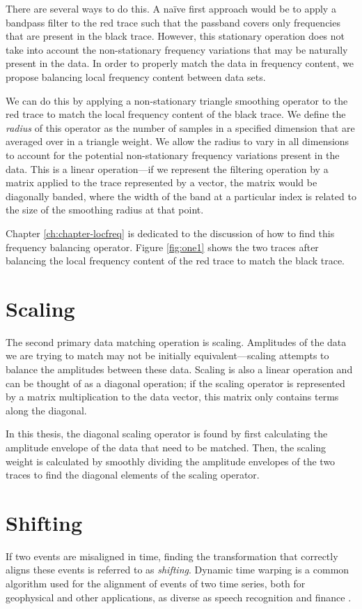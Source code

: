 There are several ways to do this.
A na\"ive first approach would be to apply a bandpass filter to the red trace such that the passband covers only frequencies that are present in the black trace.
However, this stationary operation does not take into account the non-stationary frequency variations that may be naturally present in the data.
In order to properly match the data in frequency content, we propose balancing local frequency content between data sets.

We can do this by applying a non-stationary triangle smoothing operator to the red trace to match the local frequency content of the black trace.
We define the {\em radius} of this operator as the number of samples in a specified dimension that are averaged over in a triangle weight.
We allow the radius to vary in all dimensions to account for the potential non-stationary frequency variations present in the data.
This is a linear operation---if we represent the filtering operation by a matrix applied to the trace represented by a vector, the matrix would be diagonally banded, where the width of the band at a particular index is related to the size of the smoothing radius at that point.

Chapter \ref{ch:chapter-locfreq} is dedicated to the discussion of how to find this frequency balancing operator.
Figure \ref{fig:one1} shows the two traces after balancing the local frequency content of the red trace to match the black trace.


\section{Scaling}
The second primary data matching operation is scaling. 
Amplitudes of the data we are trying to match may not be initially equivalent---scaling attempts to balance the amplitudes between these data.
Scaling is also a linear operation and can be thought of as a diagonal operation; if the scaling operator is represented by a matrix multiplication to the data vector, this matrix only contains terms along the diagonal.

In this thesis, the diagonal scaling operator is found by first calculating the amplitude envelope of the data that need to be matched.
Then, the scaling weight is calculated by smoothly dividing the amplitude envelopes of the two traces to find the diagonal elements of the scaling operator.

\section{Shifting}
If two events are misaligned in time, finding the transformation that correctly aligns these events is referred to as {\em shifting}.
Dynamic time warping is a common algorithm used for the alignment of events of two time series, both for geophysical and other applications, as diverse as speech recognition and finance \cite[]{herrera2012,hale2013,dtw,finance}.

